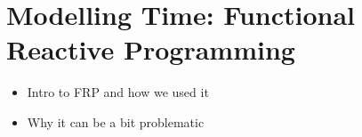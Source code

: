 \section{Modelling Time: Functional Reactive Programming}
\label{sec:frp}

\begin{itemize}
    \item Intro to FRP and how we used it
    \item Why it can be a bit problematic
\end{itemize}
